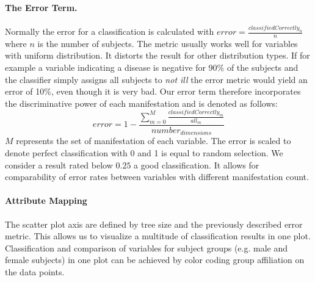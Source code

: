 \documentclass[a4paper,twoside]{style/article}
\begin{document}
\paragraph{The Error Term. }
Normally the error for a classification is calculated with $error = \frac{classifiedCorrectly_{n}} {n}$ where $n$ is the number of subjects.
The metric usually works well for variables with uniform distribution.
It distorts the result for other distribution types.
If for example a variable indicating a disease is negative for 90\% of the subjects and the classifier simply assigns all subjects to \emph{not ill} the error metric would yield an error of 10\%, even though it is very bad.
Our error term therefore incorporates the discriminative power of each manifestation and is denoted as follows:
\begin{equation}
error = 1 - \frac{\sum_{m=0}^M \frac{classifiedCorrectly_{m}}{all_{m}}}{number_{dimensions}}
\end{equation}
$M$ represents the set of manifestation of each variable.
The error is scaled to denote perfect classification with 0 and 1 is equal to random selection.
We consider a result rated below $0.25$ a good classification.
It allows for comparability of error rates between variables with different manifestation count.

\paragraph{Attribute Mapping}
The scatter plot axis are defined by tree size and the previously described error metric.
This allows us to visualize a multitude of classification results in one plot.
Classification and comparison of variables for subject groups (e.g. male and female subjects) in one plot can be achieved by color coding group affiliation on the data points.
\end{document}
